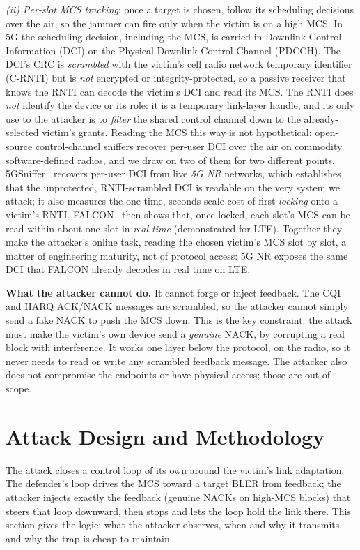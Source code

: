 \documentclass[conference]{IEEEtran}
\begin{document}
\emph{(ii) Per-slot MCS tracking}: once a target is chosen, follow its scheduling
decisions over the air, so the jammer can fire only when the victim is on a high MCS. In
5G the scheduling decision, including the MCS, is carried in Downlink Control Information
(DCI) on the Physical Downlink Control Channel (PDCCH). The DCI's CRC is \emph{scrambled} with the victim's cell radio
network temporary identifier (C-RNTI) but is \emph{not} encrypted or integrity-protected,
so a passive receiver that knows the RNTI can decode the victim's DCI and read its MCS.
The RNTI does \emph{not} identify the device or its role: it is a temporary link-layer
handle, and its only use to the attacker is to \emph{filter} the shared control channel
down to the already-selected victim's grants. Reading the MCS this way is not
hypothetical: open-source control-channel sniffers recover per-user DCI over the air on
commodity software-defined radios, and we draw on two of them for two different points.
5GSniffer~\cite{ludant2023sniffing} recovers per-user DCI from live \emph{5G NR} networks,
which establishes that the unprotected, RNTI-scrambled DCI is readable on the very system
we attack; it also measures the one-time, seconds-scale cost of first \emph{locking} onto a
victim's RNTI. FALCON~\cite{falkenberg2019falcon} then shows that, once locked, each slot's
MCS can be read within about one slot in \emph{real time} (demonstrated for LTE). Together
they make the attacker's online task, reading the chosen victim's MCS slot by slot, a
matter of engineering maturity, not of protocol access: 5G NR exposes the same DCI that
FALCON already decodes in real time on LTE.

\textbf{What the attacker cannot do.} It cannot forge or inject feedback. The CQI and
HARQ ACK/NACK messages are scrambled, so the attacker cannot simply send a fake NACK to
push the MCS down. This is the key constraint: the attack must make the victim's own
device send a \emph{genuine} NACK, by corrupting a real block with interference. It works
one layer below the protocol, on the radio, so it never needs to read or write any
scrambled feedback message. The attacker also does not compromise the endpoints or have
physical access; those are out of scope.

\section{Attack Design and Methodology}
\label{sec:attack}
The attack closes a control loop of its own around the victim's link adaptation. The
defender's loop drives the MCS toward a target BLER from feedback; the attacker injects
exactly the feedback (genuine NACKs on high-MCS blocks) that steers that loop downward,
then stops and lets the loop hold the link there. This section gives the logic: what the
attacker observes, when and why it transmits, and why the trap is cheap to maintain.
\end{document}
